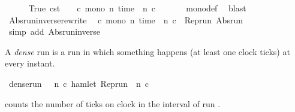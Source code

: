 \begin{isabellebody}
%
\isadelimproof
%
\endisadelimproof
%
\isatagproof
{}\isamarkupfalse%
\isanewline
\ \ \isamarkupfalse%
\ {\isacartoucheopen}{\isacharparenleft}{\isasymlambda}{\isacharunderscore}\ {\isacharunderscore}{\isachardot}\ {\isacharparenleft}True{\isacharcomma}\ {\isasymtau}\isactrlsub c\isactrlsub s\isactrlsub t\ {}{\isacharparenright}{\isacharparenright}\ {\isasymin}\ {\isacharbraceleft}{\isasymrho}{\isachardot}\ {\isasymforall}c{\isachardot}\ mono\ {\isacharparenleft}{\isasymlambda}n{\isachardot}\ time\ {\isacharparenleft}{\isasymrho}\ n\ c{\isacharparenright}{\isacharparenright}{\isacharbraceright}{\isacartoucheclose}\ \isanewline
\ \ \ \ \isamarkupfalse%
\ mono{\isacharunderscore}def\ \isamarkupfalse%
\ blast\isanewline
{}\isamarkupfalse%
%
\endisatagproof
{\isafoldproof}%
%
\isadelimproof
\isanewline
%
\endisadelimproof
\isanewline
{}\isamarkupfalse%
\ Abs{\isacharunderscore}run{\isacharunderscore}inverse{\isacharunderscore}rewrite{\isacharcolon}\isanewline
\ \ {\isacartoucheopen}{\isasymforall}c{\isachardot}\ mono\ {\isacharparenleft}{\isasymlambda}n{\isachardot}\ time\ {\isacharparenleft}{\isasymrho}\ n\ c{\isacharparenright}{\isacharparenright}\ {\isasymLongrightarrow}\ Rep{\isacharunderscore}run\ {\isacharparenleft}Abs{\isacharunderscore}run\ {\isasymrho}{\isacharparenright}\ {\isacharequal}\ {\isasymrho}{\isacartoucheclose}\isanewline
%
\isadelimproof
%
\endisadelimproof
%
\isatagproof
{}\isamarkupfalse%
\ {\isacharparenleft}simp\ add{\isacharcolon}\ Abs{\isacharunderscore}run{\isacharunderscore}inverse{\isacharparenright}%
\endisatagproof
{\isafoldproof}%
%
\isadelimproof
%
\endisadelimproof
%
\begin{isamarkuptext}%
A \emph{dense} run is a run in which something happens (at least one clock ticks) 
  at every instant.%
\end{isamarkuptext}\isamarkuptrue%
\isamarkupfalse%
\ {\isacartoucheopen}dense{\isacharunderscore}run\ {\isasymrho}\ {\isasymequiv}\ {\isacharparenleft}{\isasymforall}n{\isachardot}\ {\isasymexists}c{\isachardot}\ hamlet\ {\isacharparenleft}{\isacharparenleft}Rep{\isacharunderscore}run\ {\isasymrho}{\isacharparenright}\ n\ c{\isacharparenright}{\isacharparenright}{\isacartoucheclose}%
\begin{isamarkuptext}%
 counts the number of ticks on clock  
  in the interval \isatt{[0{\char`\,}\ n]} of run \isa{{\isasymrho}}.%

\end{isamarkuptext}
\end{isabellebody}
